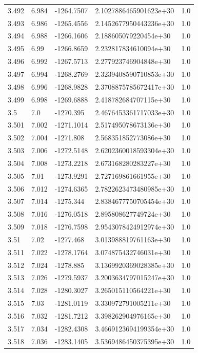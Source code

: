 \begin{tabular}{lllll}
3.492 & 6.984 & -1264.7507 & 2.1027886465901623e+30 & 1.0 \\
3.493 & 6.986 & -1265.4556 & 2.1452677950443236e+30 & 1.0 \\
3.494 & 6.988 & -1266.1606 & 2.188605079220454e+30 & 1.0 \\
3.495 & 6.99 & -1266.8659 & 2.232817834610094e+30 & 1.0 \\
3.496 & 6.992 & -1267.5713 & 2.277923746904848e+30 & 1.0 \\
3.497 & 6.994 & -1268.2769 & 2.3239408590710853e+30 & 1.0 \\
3.498 & 6.996 & -1268.9828 & 2.3708875785672417e+30 & 1.0 \\
3.499 & 6.998 & -1269.6888 & 2.418782684707115e+30 & 1.0 \\
3.5 & 7.0 & -1270.395 & 2.4676453361717033e+30 & 1.0 \\
3.501 & 7.002 & -1271.1014 & 2.517495078673136e+30 & 1.0 \\
3.502 & 7.004 & -1271.808 & 2.568351852773086e+30 & 1.0 \\
3.503 & 7.006 & -1272.5148 & 2.6202360018593304e+30 & 1.0 \\
3.504 & 7.008 & -1273.2218 & 2.673168280283227e+30 & 1.0 \\
3.505 & 7.01 & -1273.9291 & 2.727169861661955e+30 & 1.0 \\
3.506 & 7.012 & -1274.6365 & 2.7822623473480985e+30 & 1.0 \\
3.507 & 7.014 & -1275.344 & 2.8384677750705454e+30 & 1.0 \\
3.508 & 7.016 & -1276.0518 & 2.895808627749724e+30 & 1.0 \\
3.509 & 7.018 & -1276.7598 & 2.9543078424912974e+30 & 1.0 \\
3.51 & 7.02 & -1277.468 & 3.013988819761163e+30 & 1.0 \\
3.511 & 7.022 & -1278.1764 & 3.074875432746031e+30 & 1.0 \\
3.512 & 7.024 & -1278.885 & 3.1369920369028385e+30 & 1.0 \\
3.513 & 7.026 & -1279.5937 & 3.2003634797015247e+30 & 1.0 \\
3.514 & 7.028 & -1280.3027 & 3.265015110564221e+30 & 1.0 \\
3.515 & 7.03 & -1281.0119 & 3.330972791005211e+30 & 1.0 \\
3.516 & 7.032 & -1281.7212 & 3.398262904976165e+30 & 1.0 \\
3.517 & 7.034 & -1282.4308 & 3.4669123694199354e+30 & 1.0 \\
3.518 & 7.036 & -1283.1405 & 3.5369486450375395e+30 & 1.0 \\

\end{tabular}
